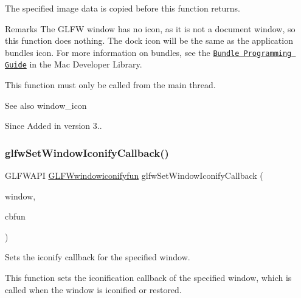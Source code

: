 The specified image data is copied before this function returns.

\begin{DoxyRemark}{Remarks}
The G\+L\+FW window has no icon, as it is not a document window, so this function does nothing. The dock icon will be the same as the application bundle\textquotesingle{}s icon. For more information on bundles, see the \href{https://developer.apple.com/library/mac/documentation/CoreFoundation/Conceptual/CFBundles/}{\tt Bundle Programming Guide} in the Mac Developer Library.
\end{DoxyRemark}
This function must only be called from the main thread.

\begin{DoxySeeAlso}{See also}
window\+\_\+icon
\end{DoxySeeAlso}
\begin{DoxySince}{Since}
Added in version 3.. 
\end{DoxySince}
\mbox{\label{group__window_ga17cd86946117b56c76397530900519db}} 
\subsubsection{\texorpdfstring{glfw\+Set\+Window\+Iconify\+Callback()}{glfwSetWindowIconifyCallback()}}
{\footnotesize\ttfamily G\+L\+F\+W\+A\+PI \hyperlink{group__window_gad2d4e4c3d28b1242e742e8268b9528af}{G\+L\+F\+Wwindowiconifyfun} glfw\+Set\+Window\+Iconify\+Callback (\begin{DoxyParamCaption}\item[{\hyperlink{group__window_ga3c96d80d363e67d13a41b5d1821f3242}{G\+L\+F\+Wwindow} $\ast$}]{window,  }\item[{\hyperlink{group__window_gad2d4e4c3d28b1242e742e8268b9528af}{G\+L\+F\+Wwindowiconifyfun}}]{cbfun }\end{DoxyParamCaption})}



Sets the iconify callback for the specified window. 

This function sets the iconification callback of the specified window, which is called when the window is iconified or restored.


